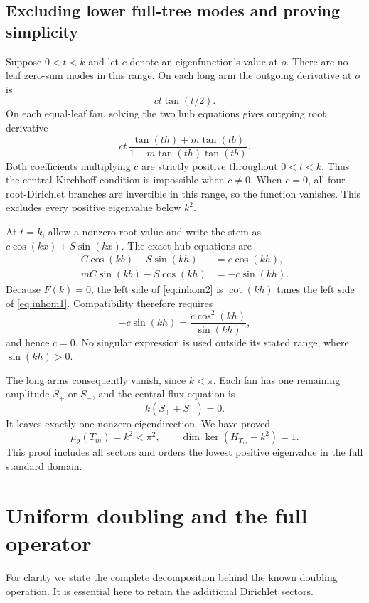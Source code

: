 \documentclass[11pt]{article}
\numberwithin{equation}{section}
\theoremstyle{remark}
\newcommand{\T}{T_m}
\begin{document}
\subsection{Excluding lower full-tree modes and proving simplicity}

Suppose \(0<t<k\) and let \(c\) denote an eigenfunction's value at \(o\).
There are no leaf zero-sum modes in this range. On each long arm the
outgoing derivative at \(o\) is
\[
  ct\tan(t/2).
\]
On each equal-leaf fan, solving the two hub equations gives outgoing
root derivative
\[
  ct\,
  \frac{\tan(th)+m\tan(tb)}
       {1-m\tan(th)\tan(tb)}.
\]
Both coefficients multiplying \(c\) are strictly positive throughout
\(0<t<k\). Thus the central Kirchhoff condition is impossible when
\(c\ne0\). When \(c=0\), all four root-Dirichlet branches are
invertible in this range, so the function vanishes. This excludes
every positive eigenvalue below \(k^2\).

At \(t=k\), allow a nonzero root value and write the stem as
\(c\cos(kx)+S\sin(kx)\). The exact hub equations are
\begin{align}
  C\cos(kb)-S\sin(kh)&=c\cos(kh),\label{eq:inhom1}\\
  mC\sin(kb)-S\cos(kh)&=-c\sin(kh).\label{eq:inhom2}
\end{align}
Because \(F(k)=0\), the left side of \eqref{eq:inhom2} is
\(\cot(kh)\) times the left side of \eqref{eq:inhom1}.
Compatibility therefore requires
\[
  -c\sin(kh)=\frac{c\cos^2(kh)}{\sin(kh)},
\]
and hence \(c=0\). No singular expression is used outside its stated
range, where \(\sin(kh)>0\).

The long arms consequently vanish, since \(k<\pi\).
Each fan has one remaining amplitude \(S_+\) or \(S_-\), and the
central flux equation is
\[
  k(S_++S_-)=0.
\]
It leaves exactly one nonzero eigendirection. We have proved
\begin{equation}\label{eq:tree-eigenvalue}
  \mu_2(\T)=k^2<\pi^2,\qquad
  \dim\ker(H_{\T}-k^2)=1.
\end{equation}
This proof includes all sectors and orders the lowest positive
eigenvalue in the full standard domain.

\section{Uniform doubling and the full operator}

For clarity we state the complete decomposition behind the known
doubling operation. It is essential here to retain the additional
Dirichlet sectors.
\end{document}
